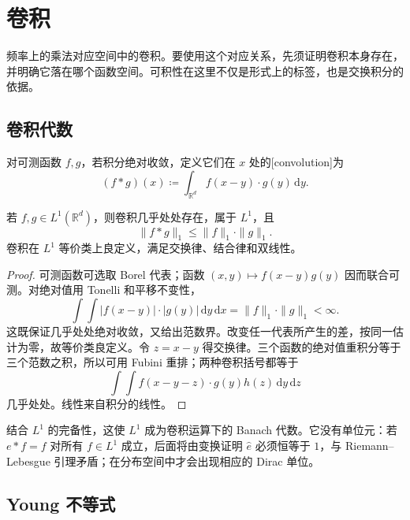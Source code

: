 \section{卷积}
\label{b2:sec:0303}

频率上的乘法对应空间中的卷积。要使用这个对应关系，先须证明卷积本身存在，并明确它落在哪个函数空间。可积性在这里不仅是形式上的标签，也是交换积分的依据。

\subsection{卷积代数}
\label{b2:subsec:030301}

\begin{definition}\label{b2:def:03-convolution}
对可测函数 \(f,g\)，若积分绝对收敛，定义它们在 \(x\) 处的[convolution]为
\[
 (f*g)(x)\coloneqq\int_{\mathbb R^d}f(x-y)\cdot g(y)\,\mathrm{d}y.
\]
\end{definition}

\begin{proposition}\label{b2:prop:03-l1-algebra}
若 \(f,g\in L^1(\mathbb R^d)\)，则卷积几乎处处存在，属于 \(L^1\)，且
\[
 \|f*g\|_1\leq\|f\|_1\cdot\|g\|_1.
\]
卷积在 \(L^1\) 等价类上良定义，满足交换律、结合律和双线性。
\end{proposition}
\begin{proof}
可测函数可选取 Borel 代表；函数 \((x,y)\mapsto f(x-y)g(y)\) 因而联合可测。对绝对值用 Tonelli 和平移不变性，
\[
 \int\!\int|f(x-y)|\cdot|g(y)|\,\mathrm{d}y\,\mathrm{d}x
 =\|f\|_1\cdot\|g\|_1<\infty.
\]
这既保证几乎处处绝对收敛，又给出范数界。改变任一代表所产生的差，按同一估计为零，故等价类良定义。令 \(z=x-y\) 得交换律。三个函数的绝对值重积分等于三个范数之积，所以可用 Fubini 重排；两种卷积括号都等于
\[
 \int\!\int f(x-y-z)\cdot g(y)h(z)\,\mathrm{d}y\,\mathrm{d}z
\]
几乎处处。线性来自积分的线性。
\end{proof}

结合 \(L^1\) 的完备性，这使 \(L^1\) 成为卷积运算下的 Banach 代数。它没有单位元：若 \(e*f=f\) 对所有 \(f\in L^1\) 成立，后面将由变换证明 \(\widehat e\) 必须恒等于 \(1\)，与 Riemann--Lebesgue 引理矛盾；在分布空间中才会出现相应的 Dirac 单位。

\subsection{Young 不等式}
\label{b2:subsec:030302}

